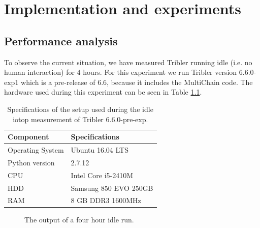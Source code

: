\chapter{Implementation and experiments}
\label{cpt:experiments}

\section{Performance analysis}
To observe the current situation, we have measured Tribler running idle (i.e. no human interaction) for 4 hours.
For this experiment we run Tribler version 6.6.0-exp1 which is a pre-release of 6.6, because it includes the MultiChain code.
The hardware used during this experiment can be seen in Table \ref{table:tribler_idle}.

\begin{table}[h]
	\centering
	\begin{tabular}{l|l}
		\textbf{Component} 	& \textbf{Specifications} \\ \hline
		Operating System   	& Ubuntu 16.04 LTS \\
		Python version		& 2.7.12 \\
		CPU					& Intel Core i5-2410M \\ 
		HDD					& Samsung 850 EVO 250GB  \\ 
		RAM					& 8 GB DDR3 1600MHz \\
	\end{tabular}
	\caption{Specifications of the setup used during the idle iotop measurement of Tribler 6.6.0-pre-exp.}
	\label{table:tribler_idle}
\end{table}

\begin{figure}[h]
	\caption{The output of a four hour idle run.}
	\label{fig:htop_io_idle_run}
\end{figure} 

